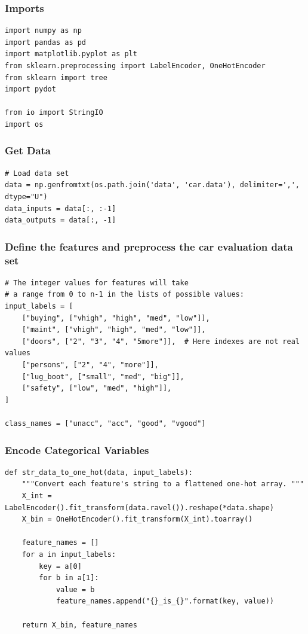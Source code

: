 \begin{frame}[fragile]\frametitle{Imports}
\begin{lstlisting}
import numpy as np
import pandas as pd
import matplotlib.pyplot as plt
from sklearn.preprocessing import LabelEncoder, OneHotEncoder
from sklearn import tree
import pydot

from io import StringIO
import os
\end{lstlisting}
\end{frame}



\begin{frame}[fragile]\frametitle{Get Data}
\begin{lstlisting}
# Load data set
data = np.genfromtxt(os.path.join('data', 'car.data'), delimiter=',', dtype="U")
data_inputs = data[:, :-1]
data_outputs = data[:, -1]
\end{lstlisting}
\end{frame}

\begin{frame}[fragile]\frametitle{Define the features and preprocess the car evaluation data set}
\begin{lstlisting}
# The integer values for features will take
# a range from 0 to n-1 in the lists of possible values:
input_labels = [
    ["buying", ["vhigh", "high", "med", "low"]],
    ["maint", ["vhigh", "high", "med", "low"]],
    ["doors", ["2", "3", "4", "5more"]],  # Here indexes are not real values
    ["persons", ["2", "4", "more"]],
    ["lug_boot", ["small", "med", "big"]],
    ["safety", ["low", "med", "high"]],
]

class_names = ["unacc", "acc", "good", "vgood"]
\end{lstlisting}
\end{frame}

\begin{frame}[fragile]\frametitle{Encode Categorical Variables}
\begin{lstlisting}
def str_data_to_one_hot(data, input_labels):
    """Convert each feature's string to a flattened one-hot array. """
    X_int = LabelEncoder().fit_transform(data.ravel()).reshape(*data.shape)
    X_bin = OneHotEncoder().fit_transform(X_int).toarray()
    
    feature_names = []
    for a in input_labels:
        key = a[0]
        for b in a[1]:
            value = b
            feature_names.append("{}_is_{}".format(key, value))

    return X_bin, feature_names
\end{lstlisting}
\end{frame}

